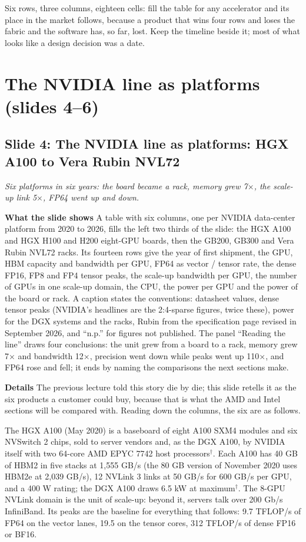 \documentclass[11pt,letterpaper]{article}
\newcommand{\setstage}[1]{\colorlet{stagec}{#1}}
\newcommand{\slide}[3]{%
  \subsection[Slide #1: #2]{Slide #1: #2}%
  {\color{muted}\itshape #3\par}\medskip}
\newcommand{\para}[1]{\medskip\noindent\textbf{#1}\quad}
\newenvironment{intuition}{\begin{tcolorbox}[intuitionbox]}{\end{tcolorbox}}
\begin{document}
\begin{intuition}
Six rows, three columns, eighteen cells: fill the table for any accelerator and its place in the market follows, because a product that wins four rows and loses the fabric and the software has, so far, lost. Keep the timeline beside it; most of what looks like a design decision was a date.
\end{intuition}
\setstage{tok}
\section{The NVIDIA line as platforms (slides 4--6)}

\slide{4}{The NVIDIA line as platforms: HGX A100 to Vera Rubin NVL72}{Six platforms in six years: the board became a rack, memory grew 7$\times$, the scale-up link 5$\times$, FP64 went up and down.}

\para{What the slide shows} A table with six columns, one per NVIDIA data-center platform from 2020 to 2026, fills the left two thirds of the slide: the HGX A100 and HGX H100 and H200 eight-GPU boards, then the GB200, GB300 and Vera Rubin NVL72 racks. Its fourteen rows give the year of first shipment, the GPU, HBM capacity and bandwidth per GPU, FP64 as vector / tensor rate, the dense FP16, FP8 and FP4 tensor peaks, the scale-up bandwidth per GPU, the number of GPUs in one scale-up domain, the CPU, the power per GPU and the power of the board or rack. A caption states the conventions: datasheet values, dense tensor peaks (NVIDIA's headlines are the 2:4-sparse figures, twice these), power for the DGX systems and the racks, Rubin from the specification page revised in September 2026, and ``n.p.'' for figures not published. The panel ``Reading the line'' draws four conclusions: the unit grew from a board to a rack, memory grew 7$\times$ and bandwidth 12$\times$, precision went down while peaks went up 110$\times$, and FP64 rose and fell; it ends by naming the comparisons the next sections make.

\para{Details} The previous lecture told this story die by die; this slide retells it as the six products a customer could buy, because that is what the AMD and Intel sections will be compared with. Reading down the columns, the six are as follows.

The HGX A100 (May 2020) is a baseboard of eight A100 SXM4 modules and six NVSwitch 2 chips, sold to server vendors and, as the DGX A100, by NVIDIA itself with two 64-core AMD EPYC 7742 host processors$^\dagger$. Each A100 has 40 GB of HBM2 in five stacks at 1{,}555 GB/s (the 80 GB version of November 2020 uses HBM2e at 2{,}039 GB/s), 12 NVLink 3 links at 50 GB/s for 600 GB/s per GPU, and a 400 W rating; the DGX A100 draws 6.5 kW at maximum$^\dagger$. The 8-GPU NVLink domain is the unit of scale-up: beyond it, servers talk over 200 Gb/s InfiniBand. Its peaks are the baseline for everything that follows: 9.7 TFLOP/s of FP64 on the vector lanes, 19.5 on the tensor cores, 312 TFLOP/s of dense FP16 or BF16.
\end{document}
